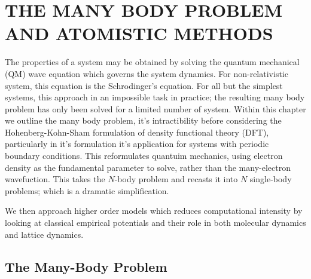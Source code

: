 \chapter{THE MANY BODY PROBLEM AND ATOMISTIC METHODS}

The properties of a system may be obtained by solving the quantum mechanical (QM) wave equation which governs the system dynamics.  For non-relativistic system, this equation is the Schrodinger's equation.  For all but the simplest systems, this approach in an impossible task in practice; the resulting many body problem has only been solved for a limited number of system.  Within this chapter we outline the many body problem, it's intractibility before considering the Hohenberg-Kohn-Sham formulation of density functional theory (DFT), particularly in it's formulation it's application for systems with periodic boundary conditions.  This reformulates quantuim mechanics, using electron density as the fundamental parameter to solve, rather than the many-electron wavefuction.  This takes the $N$-body problem and recasts it into $N$ single-body problems; which is a dramatic simplification.

We then approach higher order models which reduces computational intensity by looking at classical empirical potentials and their role in both molecular dynamics and lattice dynamics.

\section{The Many-Body Problem}

